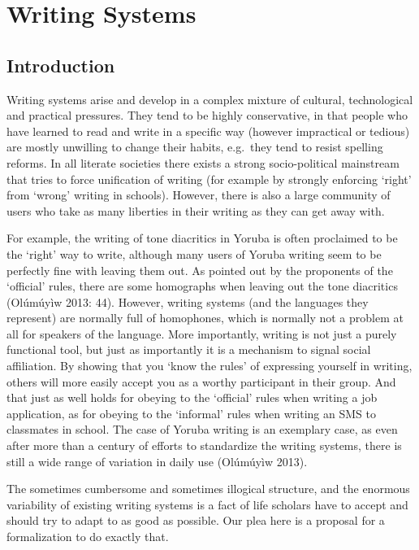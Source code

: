 \chapter{Writing Systems}
\label{writing_systems}

\section{Introduction}
\label{introduction}

Writing systems arise and develop in a complex mixture of cultural, technological and practical pressures. They tend to be highly conservative, in that people who have learned to read and write in a specific way (however impractical or tedious) are mostly unwilling to change their habits, e.g.~they tend to resist spelling reforms. In all literate societies there exists a strong socio-political mainstream that tries to force unification of writing (for example by strongly enforcing `right' from `wrong' writing in schools). However, there is also a large community of users who take as many liberties in their writing as they can get away with.

For example, the writing of tone diacritics in Yoruba is often proclaimed to be the `right' way to write, although many users of Yoruba writing seem to be perfectly fine with leaving them out. As pointed out by the proponents of the `official' rules, there are some homographs when leaving out the tone diacritics (Olúmúyìw 2013: 44). However, writing systems (and the languages they represent) are normally full of homophones, which is normally not a problem at all for speakers of the language. More importantly, writing is not just a purely functional tool, but just as importantly it is a mechanism to signal social affiliation. By showing that you `know the rules' of expressing yourself in writing, others will more easily accept you as a worthy participant in their group. And that just as well holds for obeying to the `official' rules when writing a job application, as for obeying to the `informal' rules when writing an SMS to classmates in school. The case of Yoruba writing is an exemplary case, as even after more than a century of efforts to standardize the writing systems, there is still a wide range of variation in daily use (Olúmúyìw 2013).

The sometimes cumbersome and sometimes illogical structure, and the enormous variability of existing writing systems is a fact of life scholars have to accept and should try to adapt to as good as possible. Our plea here is a proposal for a formalization to do exactly that.

